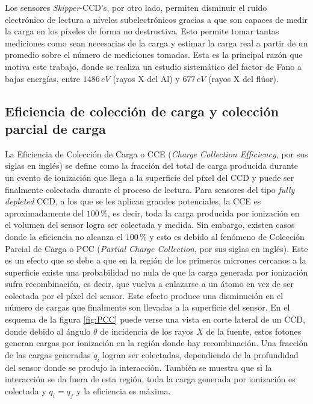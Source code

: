 Los sensores \textit{Skipper}-CCD's, por otro lado, permiten disminuir el ruido electrónico de lectura a niveles subelectrónicos gracias a que son capaces de medir la carga en los píxeles de forma no destructiva. Esto permite tomar tantas mediciones como sean necesarias de la carga y estimar la carga real a partir de un promedio sobre el número de mediciones tomadas. Esta es la principal razón que motiva este trabajo, donde se realiza un estudio sistemático del factor de Fano a bajas energías, entre $1486\,\si{eV}$ (rayos X del Al) y $677\,\si{eV}$ (rayos X del flúor).\\

\subsection{Eficiencia de colección de carga y colección parcial de carga}
\noindent La Eficiencia de Colección de Carga o CCE (\textit{Charge Collection Efficiency}, por sus siglas en inglés) se define como la fracción del total de carga producida durante un evento de ionización que llega a la superficie del píxel del CCD y puede ser finalmente colectada durante el proceso de lectura. Para sensores del tipo \textit{fully depleted} CCD, a los que se les aplican grandes potenciales, la CCE es aproximadamente del $100\,\%$, es decir, toda la carga producida por ionización en el volumen del sensor logra ser colectada y medida. Sin embargo, existen casos donde la eficiencia no alcanza el $100\,\%$ y esto es debido al fenómeno de Colección Parcial de Carga o PCC (\textit{Partial Charge Collection}, por sus siglas en inglés)\cite{PCC-CCE}. Este es un efecto que se debe a que en la región de los primeros micrones cercanos a la superficie existe una probabilidad no nula de que la carga generada por ionización sufra recombinación, es decir, que vuelva a enlazarse a un átomo en vez de ser colectada por el píxel del sensor. Este efecto produce una disminución en el número de cargas que finalmente son llevadas a la superficie del sensor. En el esquema de la figura \ref{fig:PCC} puede verse una vista en corte lateral de un CCD, donde debido al ángulo $\theta$ de incidencia de los rayos $X$ de la fuente, estos fotones generan cargas por ionización en la región donde hay recombinación. Una fracción de las cargas generadas $q_{i}$ logran ser colectadas, dependiendo de la profundidad del sensor donde se produjo la interacción. También se muestra que si la interacción se da fuera de esta región, toda la carga generada por ionización es colectada y $q_{i} = q_{f}$ y la eficiencia es máxima.

